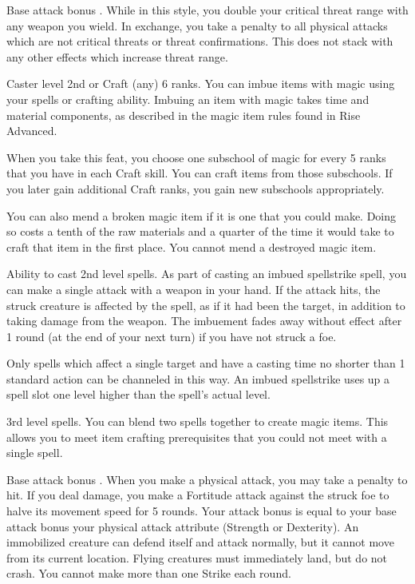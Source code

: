  Base attack bonus .
 While in this style, you double your critical threat range with any weapon you wield. In exchange, you take a  penalty to all physical attacks which are not critical threats or threat confirmations. This does not stack with any other effects which increase threat range.

 Caster level 2nd or Craft (any) 6 ranks.
 You can imbue items with magic using your spells or crafting ability. Imbuing an item with magic takes time and material components, as described in the magic item rules found in Rise Advanced.

When you take this feat, you choose one subschool of magic for every 5 ranks that you have in each Craft skill. You can craft items from those subschools. If you later gain additional Craft ranks, you gain new subschools appropriately.

You can also mend a broken magic item if it is one that you could make. Doing so costs a tenth of the raw materials and a quarter of the time it would take to craft that item in the first place. You cannot mend a destroyed magic item.

 Ability to cast 2nd level spells.
 As part of casting an imbued spellstrike spell, you can make a single attack with a weapon in your hand. If the attack hits, the struck creature is affected by the spell, as if it had been the target, in addition to taking damage from the weapon. The imbuement fades away without effect after 1 round (at the end of your next turn) if you have not struck a foe.

Only spells which affect a single target and have a casting time no shorter than 1 standard action can be channeled in this way. An imbued spellstrike uses up a spell slot one level higher than the spell's actual level.

 3rd level spells.
 You can blend two spells together to create magic items. This allows you to meet item crafting prerequisites that you could not meet with a single spell.

\featpre Base attack bonus .
\featben When you make a physical attack, you may take a  penalty to hit. If you deal damage, you make a Fortitude attack against the struck foe to halve its movement speed for 5 rounds. Your attack bonus is equal to your base attack bonus \add your physical attack attribute (Strength or Dexterity). An immobilized creature can defend itself and attack normally, but it cannot move from its current location. Flying creatures must immediately land, but do not crash. You cannot make more than one Strike each round.

